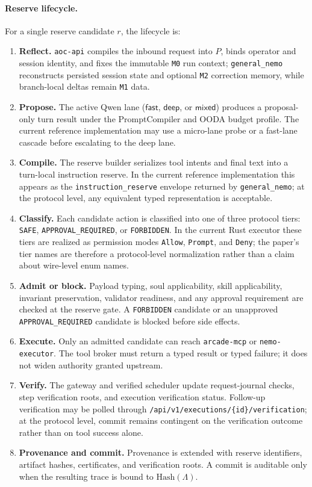 \documentclass[11pt]{article}
\theoremstyle{remark}
\newcommand{\fast}{\mathsf{fast}}
\newcommand{\deep}{\mathsf{deep}}
\newcommand{\mixed}{\mathsf{mixed}}
\begin{document}
\paragraph{Reserve lifecycle.}
For a single reserve candidate \(r\), the lifecycle is:
\begin{enumerate}[leftmargin=1.5em]
    \item \textbf{Reflect.} \texttt{aoc-api} compiles the inbound request into \(P\), binds operator and session identity, and fixes the immutable \texttt{M0} run context; \texttt{general\_nemo} reconstructs persisted session state and optional \texttt{M2} correction memory, while branch-local deltas remain \texttt{M1} data.
    \item \textbf{Propose.} The active Qwen lane (\(\fast\), \(\deep\), or \(\mixed\)) produces a proposal-only turn result under the PromptCompiler and OODA budget profile. The current reference implementation may use a micro-lane probe or a fast-lane cascade before escalating to the deep lane.
    \item \textbf{Compile.} The reserve builder serializes tool intents and final text into a turn-local instruction reserve. In the current reference implementation this appears as the \texttt{instruction\_reserve} envelope returned by \texttt{general\_nemo}; at the protocol level, any equivalent typed representation is acceptable.
    \item \textbf{Classify.} Each candidate action is classified into one of three protocol tiers: \texttt{SAFE}, \texttt{APPROVAL\_REQUIRED}, or \texttt{FORBIDDEN}. In the current Rust executor these tiers are realized as permission modes \texttt{Allow}, \texttt{Prompt}, and \texttt{Deny}; the paper's tier names are therefore a protocol-level normalization rather than a claim about wire-level enum names.
    \item \textbf{Admit or block.} Payload typing, soul applicability, skill applicability, invariant preservation, validator readiness, and any approval requirement are checked at the reserve gate. A \texttt{FORBIDDEN} candidate or an unapproved \texttt{APPROVAL\_REQUIRED} candidate is blocked before side effects.
    \item \textbf{Execute.} Only an admitted candidate can reach \texttt{arcade-mcp} or \texttt{nemo-executor}. The tool broker must return a typed result or typed failure; it does not widen authority granted upstream.
    \item \textbf{Verify.} The gateway and verified scheduler update request-journal checks, step verification roots, and execution verification status. Follow-up verification may be polled through \texttt{/api/v1/executions/\{id\}/verification}; at the protocol level, commit remains contingent on the verification outcome rather than on tool success alone.
    \item \textbf{Provenance and commit.} Provenance is extended with reserve identifiers, artifact hashes, certificates, and verification roots. A commit is auditable only when the resulting trace is bound to \(\mathrm{Hash}(\Lambda)\).
\end{enumerate}
\end{document}
